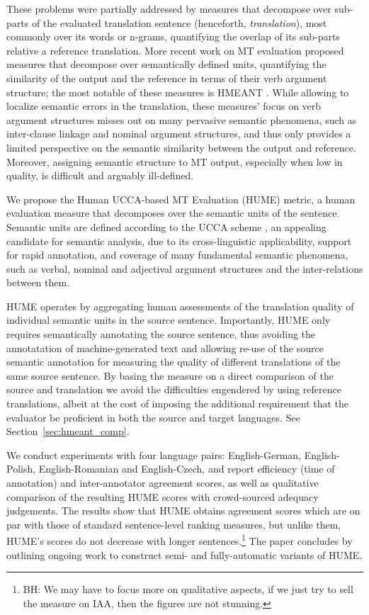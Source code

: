 \documentclass[11pt]{article}
\newcommand{\secref}[1]{Section~\ref{#1}}
\newcommand{\bh}[1]{\footnote{\color{blue}BH: #1}}
\begin{document}
These problems were partially addressed by measures that decompose over sub-parts of the evaluated
translation sentence (henceforth, {\it translation}),
most commonly over its words or n-grams,
quantifying the overlap of its sub-parts relative a reference translation.
More recent work on MT evaluation proposed measures
that decompose over semantically defined units,
quantifying the similarity of the output and the reference in terms of
their verb argument structure; the most notable of these measures is
HMEANT \cite{lo2011structured}.
While allowing to localize semantic errors in the translation,
these measures' focus on verb argument structures misses out on many pervasive semantic phenomena,
such as inter-clause linkage and nominal argument structures, and thus only provides
a limited perspective on the semantic similarity between the output and reference.
Moreover, assigning semantic structure to MT output, especially when low in quality,
is difficult and arguably ill-defined.

We propose the Human UCCA-based MT Evaluation (HUME) metric,
a human evaluation measure that decomposes over the semantic units of the sentence.
Semantic units are defined according to the 
UCCA scheme \cite{abend2013universal}, an appealing candidate for semantic analysis,
due to its cross-linguistic applicability, support for rapid annotation, and coverage
of many fundamental semantic phenomena, such as verbal, nominal and adjectival
argument structures and the inter-relations between them.

HUME operates by aggregating human assessments of the translation quality of individual
semantic units in the source sentence.
Importantly, HUME only requires semantically annotating the source sentence,
thus avoiding the annotatation of machine-generated text 
and allowing re-use of the source semantic annotation for measuring the quality
of different translations of the same source sentence.
By basing the measure on a direct comparison
of the source and translation we avoid the difficulties engendered by using
reference translations, albeit at the cost of imposing the additional requirement
that the evaluator be proficient in both the source and target languages.
See \secref{sec:hmeant_comp}.

We conduct experiments with four language pairs: English-German, English-Polish,
English-Romanian and English-Czech, and report efficiency (time of annotation) and
inter-annotator agreement scores, as well as qualitative comparison of the resulting
HUME scores with crowd-sourced adequacy judgements. The results show that HUME obtains 
agreement scores which are on par with those of standard sentence-level ranking measures,
but unlike them, HUME's scores do not decrease with longer sentences.\bh{We may
  have to focus more on qualitative aspects, if we just try to sell
  the measure on IAA, then the figures are not stunning.}
The paper concludes by outlining ongoing work to construct semi- and
fully-automatic variants of HUME.
\end{document}
